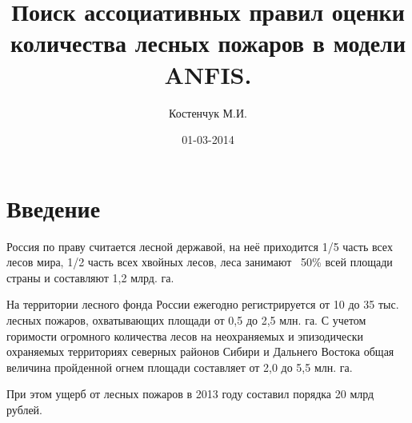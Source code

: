 \documentclass[a4paper,12pt]{article}
\title{Поиск ассоциативных правил оценки количества лесных пожаров в модели ANFIS.}
\author{Костенчук М.И.}
\date{01-03-2014}
\begin{document}
\maketitle

\section{Введение}


Россия по праву считается лесной державой, на неё приходится 1/5 часть всех лесов мира, 1/2 часть всех хвойных лесов, леса занимают ~50\% всей площади страны и составляют 1,2 млрд. га.
 
На территории лесного фонда России ежегодно регистрируется от 10 до 35 тыс. лесных пожаров, охватывающих площади от 0,5 до 2,5 млн. га. С учетом горимости огромного количества лесов на неохраняемых и эпизодически охраняемых территориях северных районов Сибири и Дальнего Востока общая величина пройденной огнем площади составляет от 2,0 до 5,5 млн. га.
 
При этом ущерб от лесных пожаров в 2013 году составил порядка 20 млрд рублей.

%
%
%
%
%
%
%
%
%
\end{document}
